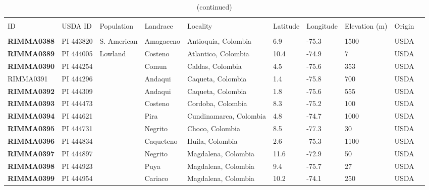 \begin{table}[h]
\begin{center}
\end{center} 

\end{table}

\clearpage

\setcounter{table}{0}
\renewcommand{\arraystretch}{1.2}

\begin{table}[h]
    \begin{center}
    \caption[]{(continued)\hspace*{13.5cm}}  
{\fontsize{7}{10}\selectfont
    \begin{tabular}{llllllllll}
        \hline\hline
       & & & \\[-4mm] 
	 ID	&	USDA ID	&	Population	&	Landrace	&	Locality	&	Latitude	&	Longitude	&	Elevation (m)	&	Origin	\\[0.0cm]
	\hline 
	& & & \\[-4mm] 
{\bf RIMMA0388}	&	PI 443820	&	S. American	&	Amagaceno	&	Antioquia, Colombia	&	6.9 	&	-75.3 	&	1500	&	USDA	\\
{\bf RIMMA0389}	&	PI 444005	&	Lowland	&	Costeno	&	Atlantico, Colombia	&	10.4 	&	-74.9 	&	7	&	USDA	\\
{\bf RIMMA0390}	&	PI 444254	&		&	Comun	&	Caldas, Colombia	&	4.5 	&	-75.6 	&	353	&	USDA	\\
RIMMA0391	&	PI 444296	&		&	Andaqui	&	Caqueta, Colombia	&	1.4 	&	-75.8 	&	700	&	USDA	\\
{\bf RIMMA0392}	&	PI 444309	&		&	Andaqui	&	Caqueta, Colombia	&	1.8 	&	-75.6 	&	555	&	USDA	\\
{\bf RIMMA0393}	&	PI 444473	&		&	Costeno	&	Cordoba, Colombia	&	8.3 	&	-75.2 	&	100	&	USDA	\\
{\bf RIMMA0394}	&	PI 444621	&		&	Pira	&	Cundinamarca, Colombia	&	4.8 	&	-74.7 	&	1000	&	USDA	\\
{\bf RIMMA0395}	&	PI 444731	&		&	Negrito	&	Choco, Colombia	&	8.5 	&	-77.3 	&	30	&	USDA	\\
{\bf RIMMA0396}	&	PI 444834	&		&	Caqueteno	&	Huila, Colombia	&	2.6 	&	-75.3 	&	1100	&	USDA	\\
{\bf RIMMA0397}	&	PI 444897	&		&	Negrito	&	Magdalena, Colombia	&	11.6 	&	-72.9 	&	50	&	USDA	\\
{\bf RIMMA0398}	&	PI 444923	&		&	Puya	&	Magdalena, Colombia	&	9.4 	&	-75.7 	&	27	&	USDA	\\
{\bf RIMMA0399}	&	PI 444954	&		&	Cariaco	&	Magdalena, Colombia	&	10.2 	&	-74.1 	&	250	&	USDA	\\

\end{tabular}}
\end{center}
\end{table}
